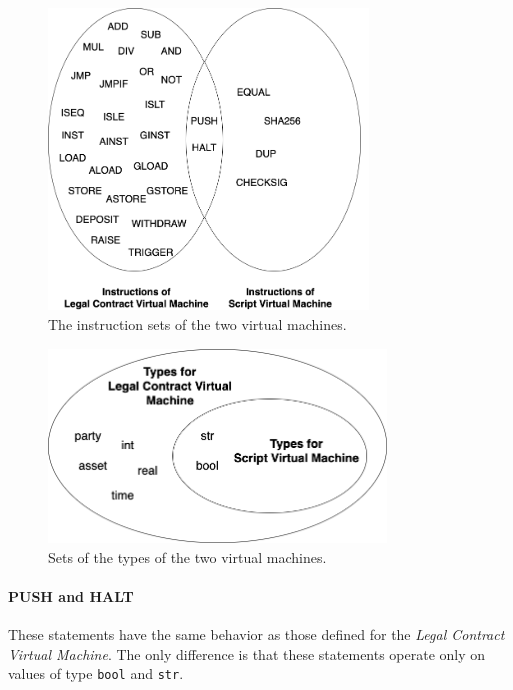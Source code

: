 \begin{figure}[htbp]
	\begin{center}
		\includegraphics[height=8cm]{immagini/capitolo-5/instructions-vms.png}
		\caption{The instruction sets of the two virtual machines.}
		\label{fig:instructions-vms}
	\end{center}
\end{figure}

\begin{figure}[htbp]
	\begin{center}
		\includegraphics[width=0.8\textwidth]{immagini/capitolo-5/types-vms.png}
		\caption{Sets of the types of the two virtual machines.}
		\label{fig:types-vms}
	\end{center}
\end{figure}

\paragraph{PUSH and HALT}

These statements have the same behavior as those defined for the \textit{Legal Contract Virtual Machine}. 
The only difference is that these statements operate only on values of type \verb|bool| and \verb|str|.

